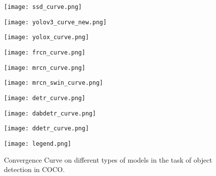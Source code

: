 \documentclass[times,twocolumn,final,authoryear]{elsarticle}
\begin{document}
\begin{figure*}[!h]
\centering
\begin{minipage}[]{.19\linewidth}
{               %
\texttt{[image: ssd\_curve.png]}}
\end{minipage}
\hspace{0in}
\begin{minipage}[]{.19\linewidth}
{               %
\texttt{[image: yolov3\_curve\_new.png]}}
\end{minipage}
\hspace{0in}
\begin{minipage}[]{.19\linewidth}
{               %
\texttt{[image: yolox\_curve.png]}}
\end{minipage}
\hspace{0in}
\begin{minipage}[]{.19\linewidth}
{               %
\texttt{[image: frcn\_curve.png]}}
\end{minipage}
\hspace{0in}
\begin{minipage}[]{.19\linewidth}
{               %
\texttt{[image: mrcn\_curve.png]}}
\end{minipage}
\begin{minipage}[]{.19\linewidth}
{               %
\texttt{[image: mrcn\_swin\_curve.png]}}
\end{minipage}
\hspace{0in}
\begin{minipage}[]{.19\linewidth}
{               %
\texttt{[image: detr\_curve.png]}}
\end{minipage}
\hspace{0in}
\begin{minipage}[]{.19\linewidth}
{               %
\texttt{[image: dabdetr\_curve.png]}}
\end{minipage}
\hspace{0in}
\begin{minipage}[]{.19\linewidth}
{               %
\texttt{[image: ddetr\_curve.png]}}
\end{minipage}
\hspace{0in}
\begin{minipage}[]{.19\linewidth}
{               %
\texttt{[image: legend.png]}}
\end{minipage}
\caption{Convergence Curve on different types of models in the task of object detection in COCO.
}
\label{fig:curve}
\end{figure*}
\end{document}
